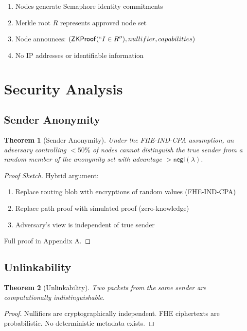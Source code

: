 \documentclass[11pt]{article}
\newtheorem{theorem}{Theorem}
\begin{document}
\begin{enumerate}
\item Nodes generate Semaphore identity commitments
\item Merkle root $R$ represents approved node set
\item Node announces: $(\mathsf{ZKProof}(``I \in R''), nullifier, capabilities)$
\item No IP addresses or identifiable information
\end{enumerate}

\section{Security Analysis}

\subsection{Sender Anonymity}

\begin{theorem}[Sender Anonymity]
Under the FHE-IND-CPA assumption, an adversary controlling $<50\%$ of nodes cannot distinguish the true sender from a random member of the anonymity set with advantage $> \mathsf{negl}(\lambda)$.
\end{theorem}

\begin{proof}[Proof Sketch]
Hybrid argument:
\begin{enumerate}
\item Replace routing blob with encryptions of random values (FHE-IND-CPA)
\item Replace path proof with simulated proof (zero-knowledge)
\item Adversary's view is independent of true sender
\end{enumerate}
Full proof in Appendix A.
\end{proof}

\subsection{Unlinkability}

\begin{theorem}[Unlinkability]
Two packets from the same sender are computationally indistinguishable.
\end{theorem}

\begin{proof}
Nullifiers are cryptographically independent. FHE ciphertexts are probabilistic. No deterministic metadata exists.
\end{proof}
\end{document}
